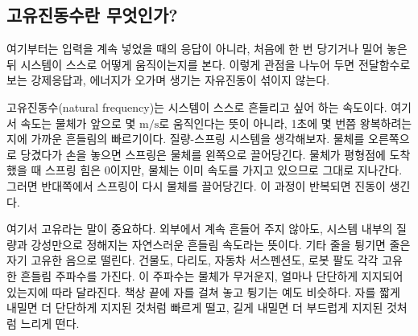 

\subsection{고유진동수란 무엇인가?}

여기부터는 입력을 계속 넣었을 때의 응답이 아니라, 처음에 한 번 당기거나 밀어 놓은 뒤 시스템이 스스로 어떻게 움직이는지를 본다.
이렇게 관점을 나누어 두면 전달함수로 보는 강제응답과, 에너지가 오가며 생기는 자유진동이 섞이지 않는다.

고유진동수(natural frequency)는 시스템이 스스로 흔들리고 싶어 하는 속도이다.
여기서 속도는 물체가 앞으로 몇 $\mathrm{m/s}$로 움직인다는 뜻이 아니라, 1초에 몇 번쯤 왕복하려는지에 가까운 흔들림의 빠르기이다.
질량-스프링 시스템을 생각해보자.
물체를 오른쪽으로 당겼다가 손을 놓으면 스프링은 물체를 왼쪽으로 끌어당긴다.
물체가 평형점에 도착했을 때 스프링 힘은 0이지만, 물체는 이미 속도를 가지고 있으므로 그대로 지나간다.
그러면 반대쪽에서 스프링이 다시 물체를 끌어당긴다.
이 과정이 반복되면 진동이 생긴다.

여기서 고유라는 말이 중요하다.
외부에서 계속 흔들어 주지 않아도, 시스템 내부의 질량과 강성만으로 정해지는 자연스러운 흔들림 속도라는 뜻이다.
기타 줄을 튕기면 줄은 자기 고유한 음으로 떨린다.
건물도, 다리도, 자동차 서스펜션도, 로봇 팔도 각각 고유한 흔들림 주파수를 가진다.
이 주파수는 물체가 무거운지, 얼마나 단단하게 지지되어 있는지에 따라 달라진다.
책상 끝에 자를 걸쳐 놓고 튕기는 예도 비슷하다.
자를 짧게 내밀면 더 단단하게 지지된 것처럼 빠르게 떨고, 길게 내밀면 더 부드럽게 지지된 것처럼 느리게 떤다.

